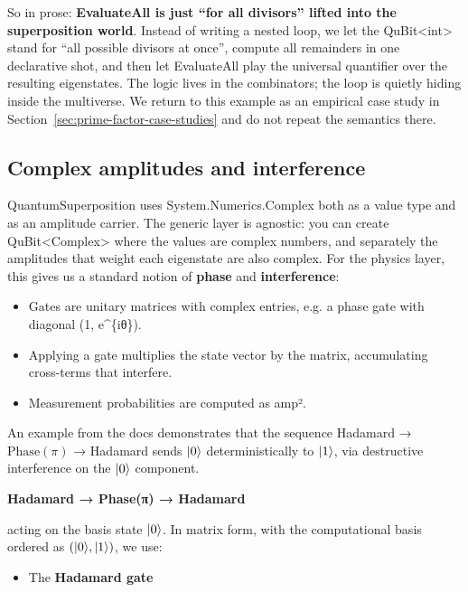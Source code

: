 \documentclass[a4paper,11pt]{article}
\begin{document}
So in prose: \textbf{EvaluateAll is just ``for all divisors'' lifted into the superposition world}. Instead of writing a nested loop, we let the QuBit\textless int\textgreater{} stand for ``all possible divisors at once'', compute all remainders in one declarative shot, and then let EvaluateAll play the universal quantifier over the resulting eigenstates. The logic lives in the combinators; the loop is quietly hiding inside the multiverse. We return to this example as an empirical case study in Section~\ref{sec:prime-factor-case-studies} and do not repeat the semantics there.

\subsection{Complex amplitudes and interference}\label{complex-amplitudes-and-interference}

QuantumSuperposition uses System.Numerics.Complex both as a value type and as an amplitude carrier. The generic layer is agnostic: you can create QuBit\textless Complex\textgreater{} where the values are complex numbers, and separately the amplitudes that weight each eigenstate are also complex.
For the physics layer, this gives us a standard notion of \textbf{phase} and \textbf{interference}:

\begin{itemize}
\item
  Gates are unitary matrices with complex entries, e.g. a phase gate with diagonal (1, e\^{}\{iθ\}).
\item
  Applying a gate multiplies the state vector by the matrix, accumulating cross-terms that interfere.
\item
  Measurement probabilities are computed as \textbar amp\textbar².
\end{itemize}

An example from the docs demonstrates that the sequence Hadamard → $\mathrm{Phase}(\pi)$ → Hadamard sends $\lvert 0 \rangle$ deterministically to $\lvert 1 \rangle$, via destructive interference on the $\lvert 0 \rangle$ component.

\textbf{Hadamard → Phase(π) → Hadamard}

acting on the basis state \(\lvert 0 \rangle\). In matrix form, with the computational basis ordered as \(( \lvert 0 \rangle, \lvert 1 \rangle)\), we use:

\begin{itemize}
\item
  The \textbf{Hadamard gate}
\end{itemize}
\end{document}
